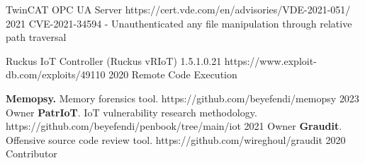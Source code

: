     \itemizeCVEnd



        \titleLinkYearRole
            {TwinCAT OPC UA Server}
            {https://cert.vde.com/en/advisories/VDE-2021-051/}
            {2021}
            {CVE-2021-34594 - Unauthenticated any file manipulation through relative path traversal}

    \itemizeCVEnd



        \titleLinkYearRole
            {Ruckus IoT Controller (Ruckus vRIoT) 1.5.1.0.21}
            {https://www.exploit-db.com/exploits/49110}
            {2020}
            {Remote Code Execution}
            
    \itemizeCVEnd


    
        \titleLinkYearRole
            {\textbf{Memopsy.} Memory forensics tool.}
            {https://github.com/beyefendi/memopsy}
            {2023}
            {Owner}            
        \titleLinkYearRole
            {\textbf{PatrIoT}. IoT vulnerability research methodology.}
            {https://github.com/beyefendi/penbook/tree/main/iot}
            {2021}
            {Owner}
        \titleLinkYearRole
            {\textbf{Graudit}. Offensive source code review tool.}
            {https://github.com/wireghoul/graudit}
            {2020}
            {Contributor}
            
    \itemizeCVEnd
